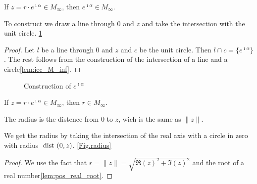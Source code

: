 \begin{lemma}
    \label{lem:angle_M_inf}
    \leanok
    If $z = r\cdot e^{\imath\alpha} \in M_{\infty}$, then $e^{\imath\alpha} \in  M_{\infty}$.
\end{lemma}
To construct we draw a line through $0$ and $z$ and take the intersection with the unit circle. \ref{Fig.angle}

\begin{proof}

    Let $l$ be a line through $0$ and $z$ and $c$ be the unit circle. Then $l \cap c = \{e^{\imath\alpha}\}$.
    The rest follows from the construction of the intersection of a line and a circle\ref{lem:icc_M_inf}.
\end{proof}

\begin{figure}[h]
    \centering
    \caption{Construction of $e^{\imath\alpha}$}
    \label{Fig.angle}
\end{figure}

\begin{lemma}
    \label{lem:construction_radius}
    If $z = r\cdot e^{\imath\alpha} \in M_{\infty}$, then $r \in  M_{\infty}$.
\end{lemma}
\begin{remark}
    The radius is the distence from $0$ to $z$, wich is the same as $\|z\|$.
\end{remark}
We get the radius by taking the intersection of the real axis with a circle in zero with radius $\text{ dist } (0,z)$. \ref{Fig.radius}
\begin{proof}
    We use the fact that $r = \|z\| = \sqrt{\Re(z)^2 + \Im(z)^2}$ and the root of a real number\ref{lem:pos_real_root}.
\end{proof}

